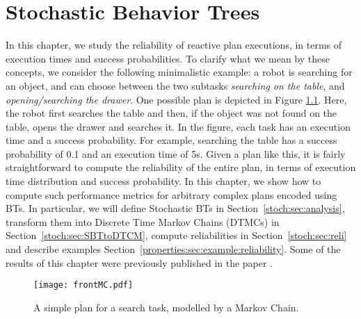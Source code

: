 

\graphicspath{{./stochastic/figures/}}


\chapter{Stochastic Behavior Trees}
\label{stochastic}
\label{ch:stochastic}




In this chapter, we study the reliability of reactive  plan executions, in terms of execution times and success probabilities. 
To clarify what we mean by these concepts, we consider the following minimalistic example: a robot is searching for an object, and can choose between the two subtasks \emph{searching on the table}, and \emph{opening/searching  the drawer}.
One possible plan is depicted in Figure \ref{stoch:mcEx1}. Here, the robot first searches the table and then, if the object was not found on the table, opens the drawer and searches it. In the figure,  each task has an execution time and a success probability. For example, searching the table has a success probability of 0.1 and an execution time of 5s. Given a plan like this, it is fairly straightforward to compute the reliability of the entire plan, in terms of execution time distribution and success probability.
In this chapter, we show how to compute such performance metrics for arbitrary complex plans encoded using BTs.
In particular, we will define Stochastic BTs in Section~\ref{stoch:sec:analysis}, transform them into Discrete Time Markov Chains (DTMCs) in Section~\ref{stoch:sec:SBTtoDTCM}, compute reliabilities in Section~\ref{stoch:sec:reli} and describe examples Section~\ref{properties:sec:example:reliability}.
Some of the results of this chapter were previously published in the 
 paper \cite{Colledanchise14}.

\begin{figure}[t]
\centering
\texttt{[image: frontMC.pdf]}
\caption{A simple plan for a search task, modelled by a Markov Chain.
}
\label{stoch:mcEx1}
\end{figure}

